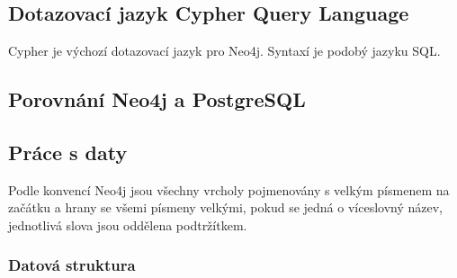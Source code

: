 \documentclass[12pt, a4paper,
 twoside,        %
 openright
]{report}
\begin{document}
    \subsection{Dotazovací jazyk Cypher Query Language}
        Cypher je výchozí dotazovací jazyk pro Neo4j. Syntaxí je podobý jazyku SQL.
    \subsection{Porovnání Neo4j a PostgreSQL}
    \subsection{Práce s daty}
        Podle konvencí Neo4j jsou všechny vrcholy pojmenovány s velkým písmenem na začátku a hrany se všemi písmeny velkými, pokud se jedná o víceslovný název, jednotlivá slova jsou oddělena podtržítkem.
        \subsubsection{Datová struktura}
\end{document}

